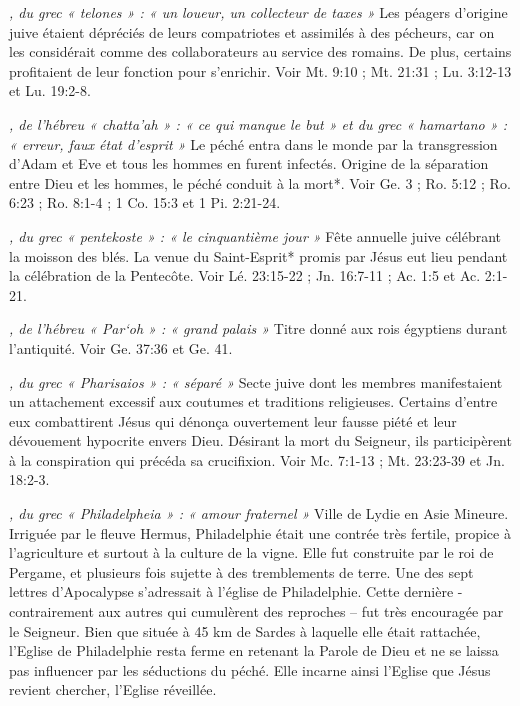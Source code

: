 \begin{multicols}{2}
{\textit{, du grec « telones » : « un loueur, un collecteur de taxes »}\newline
Les péagers d'origine juive étaient dépréciés de leurs compatriotes et assimilés à des pécheurs, car on les considérait comme des collaborateurs au service des romains. De plus, certains profitaient de leur fonction pour s'enrichir. Voir Mt. 9:10 ; Mt. 21:31 ; Lu. 3:12-13 et Lu. 19:2-8.

\textit{, de l'hébreu « chatta'ah » : « ce qui manque le but » et du grec « hamartano » : « erreur, faux état d'esprit »}\newline
Le péché entra dans le monde par la transgression d'Adam et Eve et tous les hommes en furent infectés. Origine de la séparation entre Dieu et les hommes, le péché conduit à la mort*. Voir Ge. 3 ; Ro. 5:12 ; Ro. 6:23 ; Ro. 8:1-4 ; 1 Co. 15:3 et 1 Pi. 2:21-24.

\textit{, du grec « pentekoste » : « le cinquantième jour »}\newline
Fête annuelle juive célébrant la moisson des blés. La venue du Saint-Esprit* promis par Jésus eut lieu pendant la célébration de la Pentecôte. Voir Lé. 23:15-22 ; Jn. 16:7-11 ; Ac. 1:5 et Ac. 2:1-21.

\textit{, de l'hébreu « Par`oh » : « grand palais »}\newline
Titre donné aux rois égyptiens durant l'antiquité. Voir Ge. 37:36 et Ge. 41.

\textit{, du grec « Pharisaios » : « séparé »}\newline
Secte juive dont les membres manifestaient un attachement excessif aux coutumes et traditions religieuses. Certains d'entre eux combattirent Jésus qui dénonça ouvertement leur fausse piété et leur dévouement hypocrite envers Dieu. Désirant la mort du Seigneur, ils participèrent à la conspiration qui précéda sa crucifixion. Voir Mc. 7:1-13 ; Mt. 23:23-39 et Jn. 18:2-3.

\textit{, du grec « Philadelpheia » : « amour fraternel »}\newline
Ville de Lydie en Asie Mineure. Irriguée par le fleuve Hermus, Philadelphie était une contrée très fertile, propice à l'agriculture et surtout à la culture de la vigne. Elle fut construite par le roi de Pergame, et plusieurs fois sujette à des tremblements de terre. Une des sept lettres d'Apocalypse s'adressait à l'église de Philadelphie. Cette dernière - contrairement aux autres qui cumulèrent des reproches – fut très encouragée par le Seigneur. Bien que située à 45 km de Sardes à laquelle elle était rattachée, l'Eglise de Philadelphie resta ferme en retenant la Parole de Dieu et ne se laissa pas influencer par les séductions du péché. Elle incarne ainsi l'Eglise que Jésus revient chercher, l'Eglise réveillée.

}
\end{multicols}
